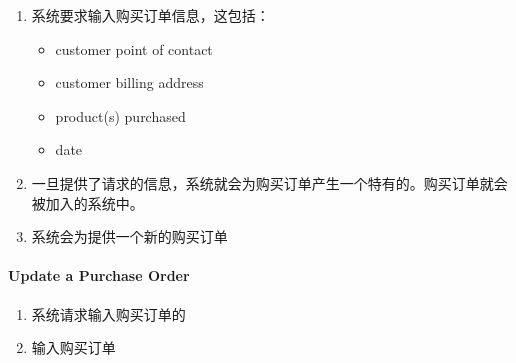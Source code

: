 \documentclass{article}
\begin{document}
\begin{enumerate}
\begin{enumerate}[noitemsep,topsep=\mdcompacttopsep]%

\item{}系统要求输入购买订单信息，这包括：

\begin{itemize}[noitemsep,topsep=\mdcompacttopsep]%

\item{}customer point of contact%

\item{}customer billing address%

\item{}product(s) purchased%

\item{}date%
\end{itemize}%

\item{}一旦提供了请求的信息，系统就会为购买订单产生一个特有的。购买订单就会被加入的系统中。%

\item{}系统会为提供一个新的购买订单%
\end{enumerate}%

\paragraph{Update a Purchase Order}\label{sec-update-a-purchase-order}%

\begin{enumerate}[noitemsep,topsep=\mdcompacttopsep]%

\item{}系统请求输入购买订单的%

\item{}输入购买订单%


\end{enumerate}
\end{enumerate}
\end{document}

